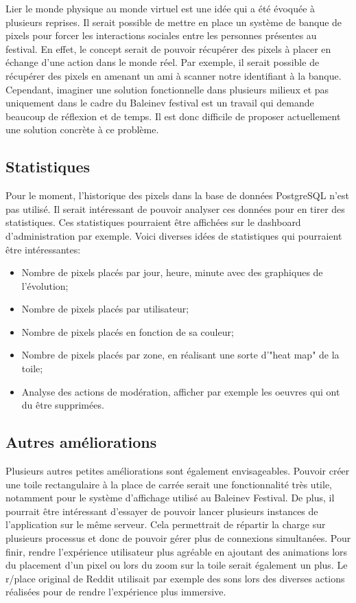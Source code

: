 Lier le monde physique au monde virtuel est une idée qui a été évoquée à plusieurs reprises. Il serait possible de mettre en place un système de banque de pixels pour forcer les interactions sociales entre les personnes présentes au festival. En effet, le concept serait de pouvoir récupérer des pixels à placer en échange d'une action dans le monde réel. Par exemple, il serait possible de récupérer des pixels en amenant un ami à scanner notre identifiant à la banque. Cependant, imaginer une solution fonctionnelle dans plusieurs milieux et pas uniquement dans le cadre du Baleinev festival est un travail qui demande beaucoup de réflexion et de temps. Il est donc difficile de proposer actuellement une solution concrète à ce problème.

\subsection{Statistiques}

Pour le moment, l'historique des pixels dans la base de données PostgreSQL n'est pas utilisé. Il serait intéressant de pouvoir analyser ces données pour en tirer des statistiques. Ces statistiques pourraient être affichées sur le dashboard d'administration par exemple. Voici diverses idées de statistiques qui pourraient être intéressantes:

\begin{itemize}
  \item Nombre de pixels placés par jour, heure, minute avec des graphiques de l'évolution;
  \item Nombre de pixels placés par utilisateur;
  \item Nombre de pixels placés en fonction de sa couleur;
  \item Nombre de pixels placés par zone, en réalisant une sorte d'"heat map" de la toile;
  \item Analyse des actions de modération, afficher par exemple les oeuvres qui ont du être supprimées.
\end{itemize}

\subsection{Autres améliorations}

Plusieurs autres petites améliorations sont également envisageables. Pouvoir créer une toile rectangulaire à la place de carrée serait une fonctionnalité très utile, notamment pour le système d'affichage utilisé au Baleinev Festival. De plus, il pourrait être intéressant d'essayer de pouvoir lancer plusieurs instances de l'application sur le même serveur. Cela permettrait de répartir la charge sur plusieurs processus et donc de pouvoir gérer plus de connexions simultanées. Pour finir, rendre l'expérience utilisateur plus agréable en ajoutant des animations lors du placement d'un pixel ou lors du zoom sur la toile serait également un plus. Le r/place original de Reddit utilisait par exemple des sons lors des diverses actions réalisées pour de rendre l'expérience plus immersive.

\vfil
\hspace{8cm}\makeatletter\@author\makeatother\par
\hspace{8cm}\begin{minipage}{5cm}
  \printsignature
\end{minipage}
